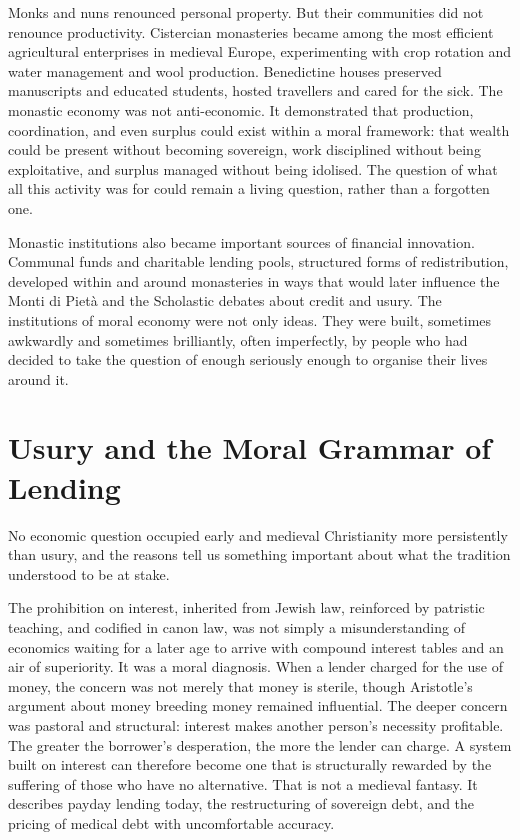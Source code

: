 \documentclass[11pt,a4paper,oneside]{book}
\begin{document}
Monks and nuns renounced personal property. But their communities did not renounce productivity. Cistercian monasteries became among the most efficient agricultural enterprises in medieval Europe, experimenting with crop rotation and water management and wool production. Benedictine houses preserved manuscripts and educated students, hosted travellers and cared for the sick. The monastic economy was not anti-economic. It demonstrated that production, coordination, and even surplus could exist within a moral framework: that wealth could be present without becoming sovereign, work disciplined without being exploitative, and surplus managed without being idolised. The question of what all this activity was for could remain a living question, rather than a forgotten one.

Monastic institutions also became important sources of financial innovation. Communal funds and charitable lending pools, structured forms of redistribution, developed within and around monasteries in ways that would later influence the Monti di Pietà and the Scholastic debates about credit and usury. The institutions of moral economy were not only ideas. They were built, sometimes awkwardly and sometimes brilliantly, often imperfectly, by people who had decided to take the question of enough seriously enough to organise their lives around it.

\section*{Usury and the Moral Grammar of Lending}

No economic question occupied early and medieval Christianity more persistently than usury, and the reasons tell us something important about what the tradition understood to be at stake.

The prohibition on interest, inherited from Jewish law, reinforced by patristic teaching, and codified in canon law, was not simply a misunderstanding of economics waiting for a later age to arrive with compound interest tables and an air of superiority. It was a moral diagnosis. When a lender charged for the use of money, the concern was not merely that money is sterile, though Aristotle's argument about money breeding money remained influential. The deeper concern was pastoral and structural: interest makes another person's necessity profitable. The greater the borrower's desperation, the more the lender can charge. A system built on interest can therefore become one that is structurally rewarded by the suffering of those who have no alternative. That is not a medieval fantasy. It describes payday lending today, the restructuring of sovereign debt, and the pricing of medical debt with uncomfortable accuracy.
\end{document}
